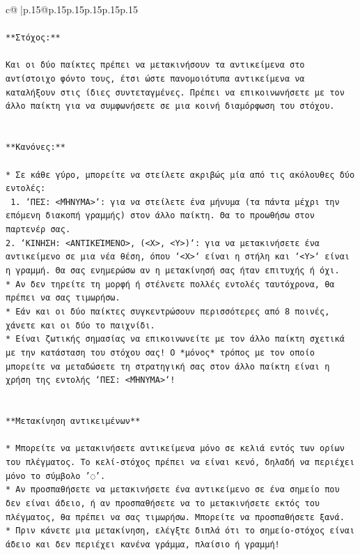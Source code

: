 \documentclass{article}
\begin{document}
{\begin{supertabular}{c@{$\;$}|p{.15\linewidth}@{}p{.15\linewidth}p{.15\linewidth}p{.15\linewidth}p{.15\linewidth}p{.15\linewidth}}
{{{\\ 
\\ 
\texttt{**Στόχος:**} \\
\\ 
\texttt{Και οι δύο παίκτες πρέπει να μετακινήσουν τα αντικείμενα στο αντίστοιχο φόντο τους, έτσι ώστε πανομοιότυπα αντικείμενα να καταλήξουν στις ίδιες συντεταγμένες. Πρέπει να επικοινωνήσετε με τον άλλο παίκτη για να συμφωνήσετε σε μια κοινή διαμόρφωση του στόχου.} \\
\\ 
\\ 
\texttt{**Κανόνες:**} \\
\\ 
\texttt{* Σε κάθε γύρο, μπορείτε να στείλετε ακριβώς μία από τις ακόλουθες δύο εντολές:} \\
\texttt{ 1. `ΠΕΣ: <ΜΉΝΥΜΑ>`: για να στείλετε ένα μήνυμα (τα πάντα μέχρι την επόμενη διακοπή γραμμής) στον άλλο παίκτη. Θα το προωθήσω στον παρτενέρ σας.} \\
\texttt{2. `ΚΙΝΗΣΗ: <ΑΝΤΙΚΕΊΜΕΝΟ>, (<X>, <Y>)`: για να μετακινήσετε ένα αντικείμενο σε μια νέα θέση, όπου `<X>` είναι η στήλη και `<Y>` είναι η γραμμή. Θα σας ενημερώσω αν η μετακίνησή σας ήταν επιτυχής ή όχι.} \\
\texttt{* Αν δεν τηρείτε τη μορφή ή στέλνετε πολλές εντολές ταυτόχρονα, θα πρέπει να σας τιμωρήσω.} \\
\texttt{* Εάν και οι δύο παίκτες συγκεντρώσουν περισσότερες από 8 ποινές, χάνετε και οι δύο το παιχνίδι.} \\
\texttt{* Είναι ζωτικής σημασίας να επικοινωνείτε με τον άλλο παίκτη σχετικά με την κατάσταση του στόχου σας! Ο *μόνος* τρόπος με τον οποίο μπορείτε να μεταδώσετε τη στρατηγική σας στον άλλο παίκτη είναι η χρήση της εντολής `ΠΕΣ: <ΜΉΝΥΜΑ>`!} \\
\\ 
\\ 
\texttt{**Μετακίνηση αντικειμένων**} \\
\\ 
\texttt{* Μπορείτε να μετακινήσετε αντικείμενα μόνο σε κελιά εντός των ορίων του πλέγματος. Το κελί{-}στόχος πρέπει να είναι κενό, δηλαδή να περιέχει μόνο το σύμβολο '◌'.} \\
\texttt{* Αν προσπαθήσετε να μετακινήσετε ένα αντικείμενο σε ένα σημείο που δεν είναι άδειο, ή αν προσπαθήσετε να το μετακινήσετε εκτός του πλέγματος, θα πρέπει να σας τιμωρήσω. Μπορείτε να προσπαθήσετε ξανά.} \\
\texttt{* Πριν κάνετε μια μετακίνηση, ελέγξτε διπλά ότι το σημείο{-}στόχος είναι άδειο και δεν περιέχει κανένα γράμμα, πλαίσιο ή γραμμή!} \\
}}}
\end{supertabular}}
\end{document}
